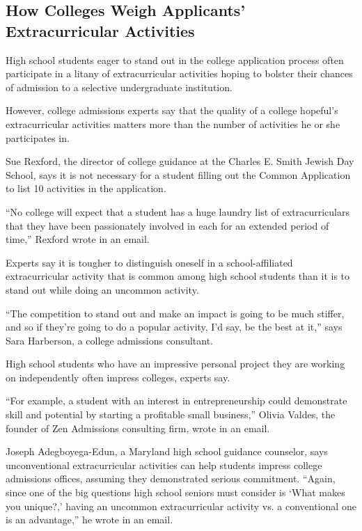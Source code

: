 \documentclass[UTF8,11pt]{ctexart}
\begin{document}
\subsection*{\textbf{How Colleges Weigh Applicants’ Extracurricular Activities}}


High school students eager to stand out in the college application process often participate in a litany of extracurricular activities hoping to bolster their chances of admission to a selective undergraduate institution.


However, college admissions experts say that the quality of a college hopeful’s extracurricular activities matters more than the number of activities he or she participates in.


Sue Rexford, the director of college guidance at the Charles E. Smith Jewish Day School, says it is not necessary for a student filling out the Common Application to list 10 activities in the application.


“No college will expect that a student has a huge laundry list of extracurriculars that they have been passionately involved in each for an extended period of time,” Rexford wrote in an email.


Experts say it is tougher to distinguish oneself in a school-affiliated extracurricular activity that is common among high school students than it is to stand out while doing an uncommon activity.


“The competition to stand out and make an impact is going to be much stiffer, and so if they’re going to do a popular activity, I’d say, be the best at it,” says Sara Harberson, a college admissions consultant.


High school students who have an impressive personal project they are working on independently often impress colleges, experts say.


“For example, a student with an interest in entrepreneurship could demonstrate skill and potential by starting a profitable small business,” Olivia Valdes, the founder of Zen Admissions consulting firm, wrote in an email.


Joseph Adegboyega-Edun, a Maryland high school guidance counselor, says unconventional extracurricular activities can help students impress college admissions offices, assuming they demonstrated serious commitment. “Again, since one of the big questions high school seniors must consider is ‘What makes you unique?,’ having an uncommon extracurricular activity vs. a conventional one is an advantage,” he wrote in an email.
\end{document}
